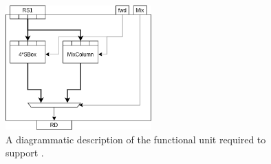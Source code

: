 \vspace*{\fill}


\newpage

\vspace*{\fill}

\begin{figure}[!h]
\centering
\includegraphics[width={0.5\textwidth}]{diagrams/ise-datapath-v1.png}
\caption{
  A diagrammatic description of the functional unit required to support .
}
\label{fig:v1:fu}
\end{figure}

\vspace*{\fill}


